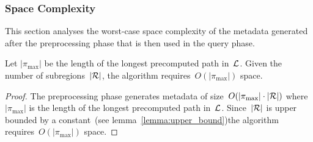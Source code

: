 \documentclass[a4paper]{report}
\begin{document}
%
%
%
\subsubsection{Space Complexity}
This section analyses the worst-case space complexity of the metadata generated after the preprocessing phase that is then used in the query phase.
\vspace{2mm}
\begin{lemma}
	Let $|\pi_{\text{max}}|$ be the length of the longest precomputed path in~$\mathcal{L}$. Given the number of subregions~$|\mathcal{R}|$, the algorithm requires~$O(|\pi_{\text{max}}|)$ space.
\end{lemma}
\begin{proof}
	The preprocessing phase generates metadata of size~$O(|\pi_{\text{max}}| \cdot |\mathcal{R}|)$ where $|\pi_{\text{max}}|$ is the length of the longest precomputed path in~$\mathcal{L}$. Since~$|\mathcal{R}|$ is upper bounded by a constant~(see lemma~\ref{lemma:upper_bound})the algorithm requires~$O(|\pi_{\text{max}}|)$ space.
\end{proof}
\end{document}
